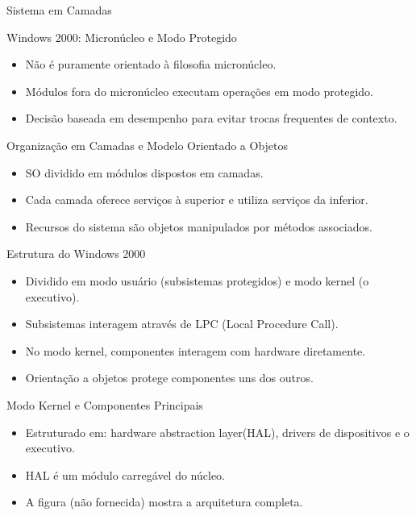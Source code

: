 \documentclass{beamer}
\begin{document}
\begin{frame}{Sistema em Camadas}
\begin{frame}{Windows 2000: Micronúcleo e Modo Protegido}
    \begin{itemize}
        \item Não é puramente orientado à filosofia micronúcleo.
        \item Módulos fora do micronúcleo executam operações em modo protegido.
        \item Decisão baseada em desempenho para evitar trocas frequentes de contexto.
    \end{itemize}
\end{frame}

\begin{frame}{Organização em Camadas e Modelo Orientado a Objetos}
    \begin{itemize}
        \item SO dividido em módulos dispostos em camadas.
        \item Cada camada oferece serviços à superior e utiliza serviços da inferior.
        \item Recursos do sistema são objetos manipulados por métodos associados.
    \end{itemize}
\end{frame}

\begin{frame}{Estrutura do Windows 2000}
    \begin{itemize}
        \item Dividido em modo usuário (subsistemas protegidos) e modo kernel (o executivo).
        \item Subsistemas interagem através de LPC (Local Procedure Call).
        \item No modo kernel, componentes interagem com hardware diretamente.
        \item Orientação a objetos protege componentes uns dos outros.
    \end{itemize}
\end{frame}

\begin{frame}{Modo Kernel e Componentes Principais}
    \begin{itemize}
        \item Estruturado em: hardware abstraction layer(HAL), drivers de dispositivos e o executivo.
        \item HAL é um módulo carregável do núcleo.
        \item A figura (não fornecida) mostra a arquitetura completa.
    \end{itemize}
\end{frame}



\end{frame}
\end{document}

